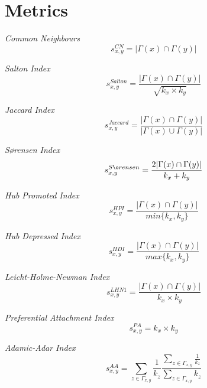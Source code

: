 \section{Metrics}
\label{sec:metrics}

\noindent
\textit{Common Neighbours}
\begin{equation}
\label{eqn:common-neighbours}
s^{CN}_{x,y}= |\Gamma(x) \cap \Gamma(y)|
\end{equation}

\noindent
\textit{Salton Index}
\begin{equation}
\label{eqn:salton}
s^{Salton}_{x,y}=
\frac{ |\Gamma(x) \cap \Gamma(y)|}{\sqrt{k_{x} \times k_{y}}}
\end{equation}

\noindent
\textit{Jaccard Index}
\begin{equation}
\label{eqn:jaccard}
s^{Jaccard}_{x,y}=
\frac{|\Gamma(x) \cap \Gamma(y)|}{|\Gamma(x) \cup \Gamma(y)|}
\end{equation}

\noindent
\textit{S\o rensen Index}
\begin{equation}
\label{eqn:sorensen}
s^{S\o rensen}_{x,y}=
\frac{2|\Gamma(x) \cap \Gamma(y)|}{k_{x} + k_{y}}
\end{equation}

\noindent
\textit{Hub Promoted Index}
\begin{equation}
\label{eqn:hpi}
s^{HPI}_{x,y}=
\frac{|\Gamma(x) \cap \Gamma(y)|}{min\{k_{x},k_{y}\}}
\end{equation}

\noindent
\textit{Hub Depressed Index}
\begin{equation}
\label{eqn:hdi}
s^{HDI}_{x,y}=
\frac{|\Gamma(x) \cap \Gamma(y)|}{max\{k_{x},k_{y}\}}
\end{equation}

\noindent
\textit{Leicht-Holme-Newman Index}
\begin{equation}
\label{eqn:lhn1}
s^{LHN1}_{x,y}=
\frac{|\Gamma(x) \cap \Gamma(y)|}{k_{x} \times k_{y}}
\end{equation}

\noindent
\textit{Preferential Attachment Index}
\begin{equation}
\label{eqn:pa}
s^{PA}_{x,y}= k_{x} \times k_{y}
\end{equation}

\noindent
\textit{Adamic-Adar Index}
\begin{equation}
\label{eqn:adamic-adar}
s^{AA}_{x,y}=
\sum\limits_{z\in\Gamma_{x,y}}\frac{1}{k_{z}}
\frac{\sum\limits_{z\in\Gamma_{x,y}}\frac{1}{k_{z}}}
{\sum\limits_{z\in\Gamma_{x,y}}k_{z}}
\end{equation}

